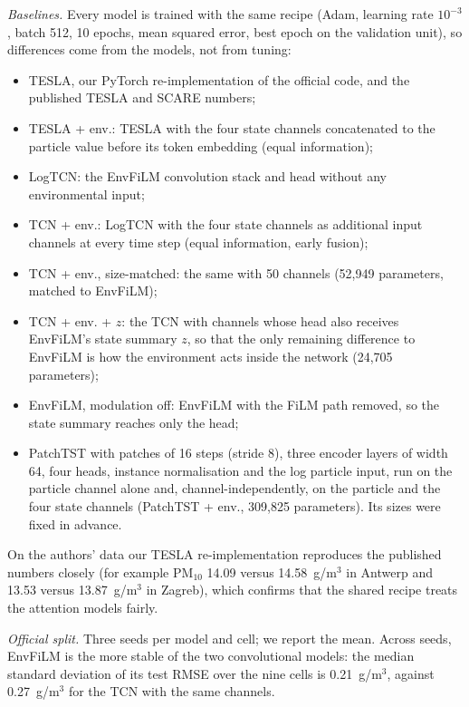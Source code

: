 \documentclass[journal]{IEEEtran}
\newcommand{\PMten}{PM$_{10}$}
\newcommand{\ugm}{\textmu g/m$^3$}
\begin{document}
\textit{Baselines.} Every model is trained with the same recipe (Adam, learning rate $10^{-3}$, batch 512, 10 epochs,
mean squared error, best epoch on the validation unit), so differences come from the models, not from tuning:
\begin{itemize}
\item TESLA, our PyTorch re-implementation of the official code, and the published TESLA and SCARE numbers;
\item TESLA + env.: TESLA with the four state channels concatenated to the particle value before its token
embedding (equal information);
\item LogTCN: the EnvFiLM convolution stack and head without any environmental input;
\item TCN + env.: LogTCN with the four state channels as additional input channels at every time step (equal
information, early fusion);
\item TCN + env., size-matched: the same with 50 channels (52,949 parameters, matched to EnvFiLM);
\item TCN + env. + $z$: the TCN with channels whose head also receives EnvFiLM's state summary $z$, so that the only
remaining difference to EnvFiLM is how the environment acts inside the network (24,705 parameters);
\item EnvFiLM, modulation off: EnvFiLM with the FiLM path removed, so the state summary reaches only the head;
\item PatchTST \cite{nie2023} with patches of 16 steps (stride 8), three encoder layers of width 64, four heads,
instance normalisation and the log particle input, run on the particle channel alone and, channel-independently, on
the particle and the four state channels (PatchTST + env., 309,825 parameters). Its sizes were fixed in advance.
\end{itemize}
On the authors' data our TESLA re-implementation reproduces the published numbers closely (for example \PMten{} 14.09
versus 14.58~\ugm{} in Antwerp and 13.53 versus 13.87~\ugm{} in Zagreb), which confirms that the shared recipe treats the attention
models fairly.

\textit{Official split.} Three seeds per model and cell; we report the mean. Across seeds, EnvFiLM is the more stable
of the two convolutional models: the median standard deviation of its test RMSE over the nine cells is 0.21~\ugm{},
against 0.27~\ugm{} for the TCN with the same channels.
\end{document}
